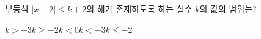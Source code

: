 부등식 $|x-2|\le k+2$의 해가 존재하도록 하는 실수 $k$의 값의 범위는?
\begin{choices32}{$k>-3$}{$k\ge -2$}{$k<0$}{$k<-3$}{$k\le -2$}\end{choices32}
